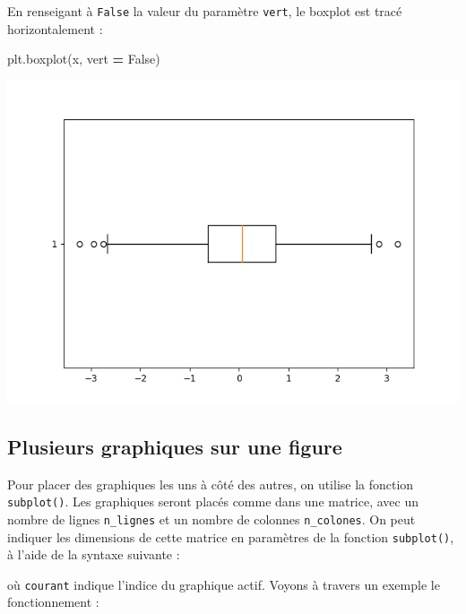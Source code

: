 \documentclass[12pt,]{book}
\newenvironment{Shaded}{\begin{snugshade}}{\end{snugshade}}
\newcommand{\VariableTok}[1]{\textcolor[rgb]{0.00,0.00,0.00}{#1}}
\newcommand{\OperatorTok}[1]{\textcolor[rgb]{0.81,0.36,0.00}{\textbf{#1}}}
\newcommand{\NormalTok}[1]{#1}
\numberwithin{equation}{section}
\numberwithin{countremarque}{section}
\begin{document}
En renseigant à \texttt{False} la valeur du paramètre \texttt{vert}, le
boxplot est tracé horizontalement :

\begin{Shaded}
\begin{Highlighting}[]
\NormalTok{plt.boxplot(x, vert }\OperatorTok{=} \VariableTok{False}\NormalTok{)}
\end{Highlighting}
\end{Shaded}

\begin{center}\includegraphics[width=9.03in]{figs/pyplot/boxplot_horizontal} \end{center}

\subsection{Plusieurs graphiques sur une
figure}\label{plusieurs-graphiques-sur-une-figure}

Pour placer des graphiques les uns à côté des autres, on utilise la
fonction \texttt{subplot()}. Les graphiques seront placés comme dans une
matrice, avec un nombre de lignes \texttt{n\_lignes} et un nombre de
colonnes \texttt{n\_colones}. On peut indiquer les dimensions de cette
matrice en paramètres de la fonction \texttt{subplot()}, à l'aide de la
syntaxe suivante :

où \texttt{courant} indique l'indice du graphique actif. Voyons à
travers un exemple le fonctionnement :
\end{document}

